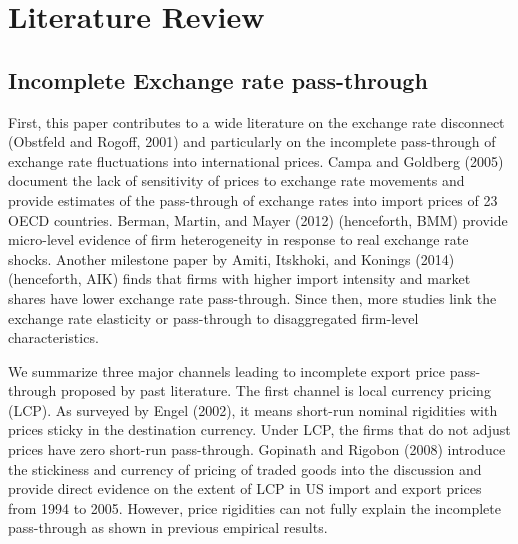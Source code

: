 \chapter{Literature Review} \label{sec-2.literature}

\section{Incomplete Exchange rate pass-through}

First, this paper contributes to a wide literature on the exchange rate disconnect (Obstfeld and Rogoff, 2001\cite{obstfeld2000}) and particularly on the incomplete pass-through of exchange rate fluctuations into international prices. Campa and Goldberg (2005)\cite{campa2005} document the lack of sensitivity of prices to exchange rate movements and provide estimates of the pass-through of exchange rates into import prices of 23 OECD countries. Berman, Martin, and Mayer (2012)\cite{bmm2012} (henceforth, BMM) provide micro-level evidence of firm heterogeneity in response to real exchange rate shocks. Another milestone paper by Amiti, Itskhoki, and Konings (2014)\cite{aik2014} (henceforth, AIK) finds that firms with higher import intensity and market shares have lower exchange rate pass-through. Since then, more studies link the exchange rate elasticity or pass-through to disaggregated firm-level characteristics.

We summarize three major channels leading to incomplete export price pass-through proposed by past literature. The first channel is local currency pricing (LCP). As surveyed by Engel (2002)\cite{engel2002}, it means short-run nominal rigidities with prices sticky in the destination currency. Under LCP, the firms that do not adjust prices have zero short-run pass-through. Gopinath and Rigobon (2008)\cite{gopinath2008} introduce the stickiness and currency of pricing of traded goods into the discussion and provide direct evidence on the extent of LCP in US import and export prices from 1994 to 2005.  However, price rigidities can not fully explain the incomplete pass-through as shown in previous empirical results.

